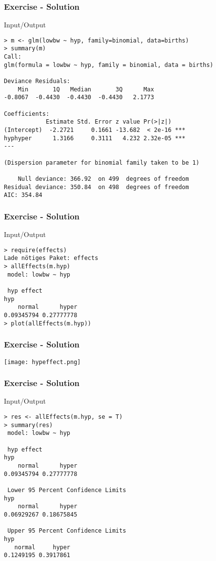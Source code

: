 \begin{frame}[fragile]\frametitle{Exercise - Solution}\footnotesize
\begin{exampleblock}{Input/Output}\scriptsize
\begin{verbatim}
> m <- glm(lowbw ~ hyp, family=binomial, data=births)
> summary(m)
Call:
glm(formula = lowbw ~ hyp, family = binomial, data = births)

Deviance Residuals: 
    Min       1Q   Median       3Q      Max  
-0.8067  -0.4430  -0.4430  -0.4430   2.1773  

Coefficients:
            Estimate Std. Error z value Pr(>|z|)    
(Intercept)  -2.2721     0.1661 -13.682  < 2e-16 ***
hyphyper      1.3166     0.3111   4.232 2.32e-05 ***
---

(Dispersion parameter for binomial family taken to be 1)

    Null deviance: 366.92  on 499  degrees of freedom
Residual deviance: 350.84  on 498  degrees of freedom
AIC: 354.84

\end{verbatim}
\end{exampleblock}
\end{frame}



\begin{frame}[fragile]\frametitle{Exercise - Solution}\footnotesize
\begin{exampleblock}{Input/Output}\small
\begin{verbatim}
> require(effects)
Lade nötiges Paket: effects
> allEffects(m.hyp)
 model: lowbw ~ hyp

 hyp effect
hyp
    normal      hyper 
0.09345794 0.27777778 
> plot(allEffects(m.hyp))
\end{verbatim}
\end{exampleblock}
\end{frame}



\begin{frame}[fragile]\frametitle{Exercise - Solution}\footnotesize
  \begin{center}
    \texttt{[image: hypeffect.png]}
  \end{center}
\end{frame}

\begin{frame}[fragile]\frametitle{Exercise - Solution}\footnotesize
\begin{exampleblock}{Input/Output}\scriptsize
\begin{verbatim}
> res <- allEffects(m.hyp, se = T)
> summary(res)
 model: lowbw ~ hyp

 hyp effect
hyp
    normal      hyper 
0.09345794 0.27777778 

 Lower 95 Percent Confidence Limits
hyp
    normal      hyper 
0.06929267 0.18675845 

 Upper 95 Percent Confidence Limits
hyp
   normal     hyper 
0.1249195 0.3917861 
\end{verbatim}
\end{exampleblock}
\end{frame}

